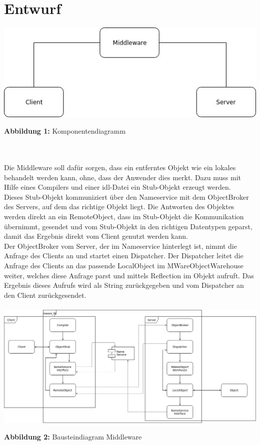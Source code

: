 %
\chapter{Entwurf}
\includegraphics[scale=0.8]{../pictures/Komponenten.jpg}\\
\centerline{\textbf{Abbildung 1:} Komponentendiagramm}\\
\\Die Middleware soll dafür sorgen, dass ein entferntes Objekt wie ein lokales behandelt werden kann, ohne, dass der Anwender dies merkt. Dazu muss mit Hilfe eines Compilers und einer idl-Datei ein Stub-Objekt erzeugt werden.\\
Dieses Stub-Objekt kommuniziert über den Nameservice mit dem ObjectBroker des Servers, auf dem das richtige Objekt liegt. Die Antworten des Objektes werden direkt an ein RemoteObject, dass im Stub-Objekt die Kommunikation übernimmt, gesendet und vom Stub-Objekt in den richtigen Datentypen geparst, damit das Ergebnis direkt vom Client genutzt werden kann.\\
Der ObjectBroker vom Server, der im Nameservice hinterlegt ist, nimmt die Anfrage des Clients an und startet einen Dispatcher. Der Dispatcher leitet die Anfrage des Clients  an das passende LocalObject im MWareObjectWarehouse weiter, welches diese Anfrage parst und mittels Reflection im Objekt aufruft. Das Ergebnis dieses Aufrufs wird als String zurückgegeben und vom Dispatcher an den Client zurückgesendet.\\
\\
\includegraphics[scale=0.35]{../pictures/Baustein.jpg}\\
\centerline{\textbf{Abbildung 2:} Bausteindiagram Middleware}\\

